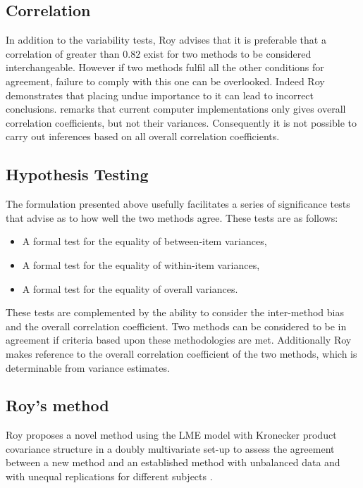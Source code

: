 \documentclass[12pt, a4paper]{report}
\theoremstyle{plain}
\theoremstyle{definition}
\theoremstyle{remark}
\begin{document}
\subsection{Correlation}
In addition to the variability tests, Roy advises that it is preferable that a correlation of greater than $0.82$ exist for two methods to be considered interchangeable. However if two methods fulfil all the other conditions for agreement, failure to comply with this one can be overlooked. Indeed Roy demonstrates that placing undue importance to it can lead to incorrect conclusions. \citet{roy} remarks that current computer implementations only gives overall correlation coefficients, but not their variances. Consequently it is not possible to carry out inferences based on all overall correlation coefficients.


\subsection{Hypothesis Testing}
The formulation presented above usefully facilitates a series of
significance tests that advise as to how well the two methods
agree. These tests are as follows:
\begin{itemize}
	\item A formal test for the equality of between-item variances,
	\item A formal test for the equality of within-item variances,
	\item A formal test for the equality of overall variances.
\end{itemize}
These tests are complemented by the ability to consider the inter-method bias and the overall correlation coefficient. Two methods can be considered to be in agreement if criteria based upon these methodologies are met. Additionally Roy makes reference to the overall correlation coefficient of the two methods, which is determinable from variance estimates.

\newpage




\subsection{Roy's method}


Roy proposes a novel method using the LME model with Kronecker product covariance structure in a doubly multivariate set-up to assess the agreement between a new method and an established method with unbalanced data and with unequal replications for different subjects \citep{Roy}.
\end{document}
